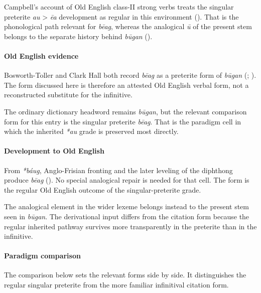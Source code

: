 \documentclass[
  british,
  a4paper,
]{article}
\begin{document}
Campbell's account of Old English class-II strong verbs treats the
singular preterite \emph{au} \textgreater{} \emph{ēa} development as
regular in this environment (). That is the phonological path relevant for \emph{bēag}, whereas
the analogical \emph{ū} of the present stem belongs to the separate
history behind \emph{būgan} ().

\paragraph{Old English evidence}\label{old-english-evidence-41}

Bosworth-Toller and Clark Hall both record \emph{bēag} as a preterite
form of \emph{būgan} (; ).
The form discussed here is therefore an attested Old English verbal
form, not a reconstructed substitute for the infinitive.

The ordinary dictionary headword remains \emph{būgan}, but the relevant
comparison form for this entry is the singular preterite \emph{bēag}.
That is the paradigm cell in which the inherited \emph{*au} grade is
preserved most directly.

\paragraph{Development to Old
English}\label{development-to-old-english-41}

From \emph{*báug}, Anglo-Frisian fronting and the later leveling of the
diphthong produce \emph{bēag} (). No special analogical repair is needed for that cell. The
form is the regular Old English outcome of the singular-preterite grade.

The analogical element in the wider lexeme belongs instead to the
present stem seen in \emph{būgan}. The derivational input differs from
the citation form because the regular inherited pathway survives more
transparently in the preterite than in the infinitive.

\paragraph{Paradigm comparison}\label{paradigm-comparison-2}

The comparison below sets the relevant forms side by side. It
distinguishes the regular singular preterite from the more familiar
infinitival citation form.
\end{document}
